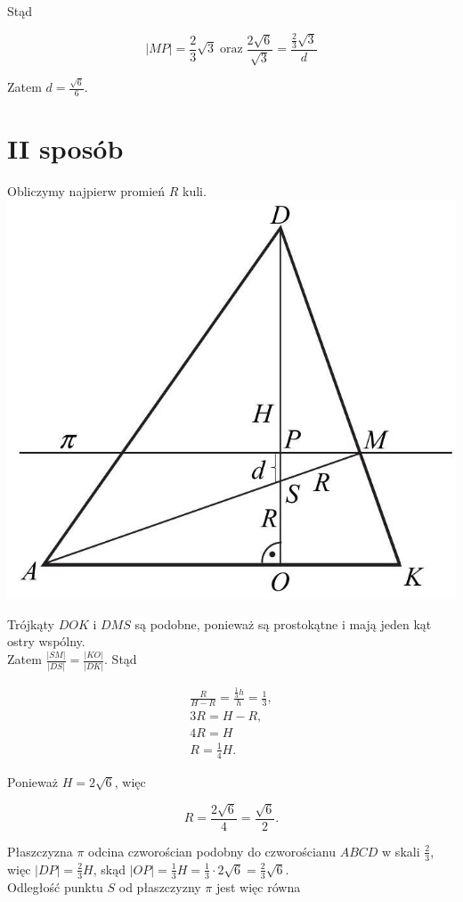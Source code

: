 \documentclass[10pt]{article}
\begin{document}
Stąd

$$
|M P|=\frac{2}{3} \sqrt{3} \operatorname{oraz} \frac{2 \sqrt{6}}{\sqrt{3}}=\frac{\frac{2}{3} \sqrt{3}}{d}
$$

Zatem $d=\frac{\sqrt{6}}{6}$.

\section*{II sposób}
Obliczymy najpierw promień $R$ kuli.\\
\includegraphics[max width=\textwidth, center]{2025_02_07_cd06b1485e4d114dda29g-14}

Trójkąty $D O K$ i $D M S$ są podobne, ponieważ są prostokątne i mają jeden kąt ostry wspólny.\\
Zatem $\frac{|S M|}{|D S|}=\frac{|K O|}{|D K|}$. Stąd

$$
\begin{gathered}
\frac{R}{H-R}=\frac{\frac{1}{3} h}{h}=\frac{1}{3}, \\
3 R=H-R, \\
4 R=H \\
R=\frac{1}{4} H .
\end{gathered}
$$

Ponieważ $H=2 \sqrt{6}$, więc

$$
R=\frac{2 \sqrt{6}}{4}=\frac{\sqrt{6}}{2} .
$$

Płaszczyzna $\pi$ odcina czworościan podobny do czworościanu $A B C D$ w skali $\frac{2}{3}$, więc $|D P|=\frac{2}{3} H$, skąd $|O P|=\frac{1}{3} H=\frac{1}{3} \cdot 2 \sqrt{6}=\frac{2}{3} \sqrt{6}$.\\
Odległość punktu $S$ od płaszczyzny $\pi$ jest więc równa
\end{document}
